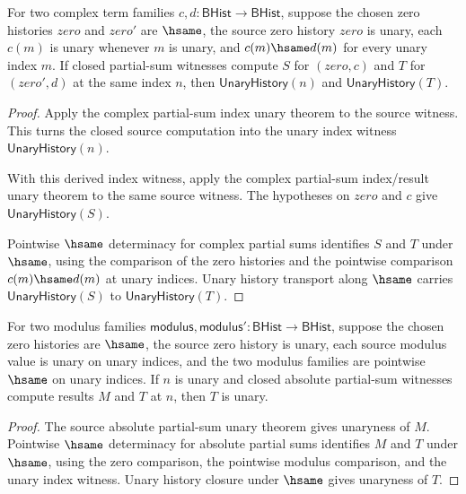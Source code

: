 \begin{theorem}
\label{thm:real-analytic-complex-part-sum-closed-pointwise-index-result-unary-transport}
For two complex term families $c,d:\mathsf{BHist}\to\mathsf{BHist}$, suppose
the chosen zero histories $zero$ and $zero'$ are $\hsame$, the source zero
history $zero$ is unary, each $c(m)$ is unary whenever $m$ is unary, and
$c(m)\hsame d(m)$ for every unary index $m$. If closed partial-sum witnesses
compute $S$ for $(zero,c)$ and $T$ for $(zero',d)$ at the same index $n$, then
$\mathsf{UnaryHistory}(n)$ and $\mathsf{UnaryHistory}(T)$.
\end{theorem}
\begin{proof}
Apply the complex partial-sum index unary theorem to the source witness. This
turns the closed source computation into the unary index witness
$\mathsf{UnaryHistory}(n)$.

With this derived index witness, apply the complex partial-sum index/result
unary theorem to the same source witness. The hypotheses on $zero$ and $c$
give $\mathsf{UnaryHistory}(S)$.

Pointwise $\hsame$ determinacy for complex partial sums identifies $S$ and
$T$ under $\hsame$, using the comparison of the zero histories and the
pointwise comparison $c(m)\hsame d(m)$ at unary indices. Unary history
transport along $\hsame$ carries $\mathsf{UnaryHistory}(S)$ to
$\mathsf{UnaryHistory}(T)$.
\end{proof}

\begin{theorem}
\label{thm:real-analytic-complex-abs-part-sum-pointwise-result-unary-transport}
For two modulus families $\mathsf{modulus},\mathsf{modulus}':
\mathsf{BHist}\to\mathsf{BHist}$, suppose the chosen zero histories are
$\hsame$, the source zero history is unary, each source modulus value is unary
on unary indices, and the two modulus families are pointwise $\hsame$ on unary
indices. If $n$ is unary and closed absolute partial-sum witnesses compute
results $M$ and $T$ at $n$, then $T$ is unary.
\end{theorem}
\begin{proof}
The source absolute partial-sum unary theorem gives unaryness of $M$.
Pointwise $\hsame$ determinacy for absolute partial sums identifies $M$ and
$T$ under $\hsame$, using the zero comparison, the pointwise modulus
comparison, and the unary index witness. Unary history closure under $\hsame$
gives unaryness of $T$.
\end{proof}

